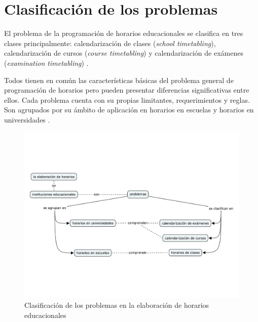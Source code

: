 \documentclass[draft,12pt,headsepline,footsepline,paper=letter]{scrreprt}
\begin{document}

\section{Clasificación de los problemas}
\label{sec:clasificacion_problemas}

El problema de la programación de horarios educacionales se clasifica en tres clases principalmente:
calendarización de clases (\textit{school timetabling}),
calendarización de cursos (\textit{course timetabling}) y
calendarización de exámenes (\textit{examination timetabling}) \citep[p.~88]{schaerf99a-survey-of-automated}.

Todos tienen en común las características básicas del problema general de programación de horarios pero pueden presentar diferencias significativas entre ellos. Cada problema cuenta con su propias limitantes, requerimientos y reglas. Son agrupados por su ámbito de aplicación en horarios en escuelas y horarios en universidades \citep[p.~10]{abdullah06heuristic-approaches}.

\begin{figure}[hbtp]
\centering
\includegraphics[width=.8\textwidth, trim=0 140 0 140]{timetabling_classification.pdf}
\caption[Clasificación del problema]{Clasificación de los problemas en la elaboración de horarios educacionales}
\label{fig:timetabling_classification}
\end{figure}
\end{document}
